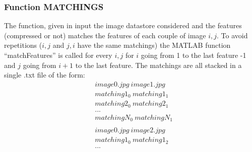 \subsubsection{Function MATCHINGS} \label{sec:MATCHINGS}
The function, given in input the image datastore considered and the features (compressed or not) matches the features of each couple of image $i,j$. To avoid repetitions ($i,j$ and $j,i$ have the same matchings) the MATLAB function ``matchFeatures'' is called for every $i,j$ for $i$ going from 1 to the last feature -1 and $j$ going from $i+1$ to the last feature. The matchings are all stacked in a single .txt file of the form:
\begin{align*}
& image0.jpg\ image1.jpg \\
& matching1_0\ matching1_1 \\
& matching2_0\ matching2_1 \\
& ... \\
& matchingN_0\ matchingN_1 \\
& \\
& image0.jpg\ image2.jpg \\
& matching1_0\ matching1_2 \\
& ...
\end{align*}  